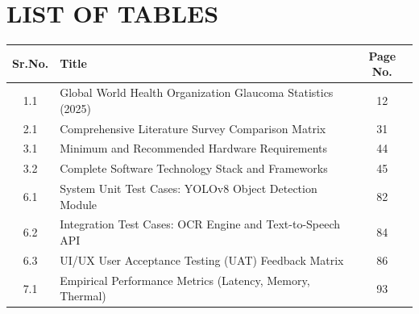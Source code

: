 \documentclass[12pt, a4paper]{report}
\begin{document}
\chapter*{LIST OF TABLES}
\begin{table}[H]
\centering
\renewcommand{\arraystretch}{1.5}
\begin{tabular}{|c|l|c|}
\hline
\textbf{Sr.No.} & \textbf{Title} & \textbf{Page No.} \\
\hline
1.1 & Global World Health Organization Glaucoma Statistics (2025) & 12 \\
2.1 & Comprehensive Literature Survey Comparison Matrix & 31 \\
3.1 & Minimum and Recommended Hardware Requirements & 44 \\
3.2 & Complete Software Technology Stack and Frameworks & 45 \\
6.1 & System Unit Test Cases: YOLOv8 Object Detection Module & 82 \\
6.2 & Integration Test Cases: OCR Engine and Text-to-Speech API & 84 \\
6.3 & UI/UX User Acceptance Testing (UAT) Feedback Matrix & 86 \\
7.1 & Empirical Performance Metrics (Latency, Memory, Thermal) & 93 \\
\hline
\end{tabular}
\end{table}

\newpage
\end{document}

